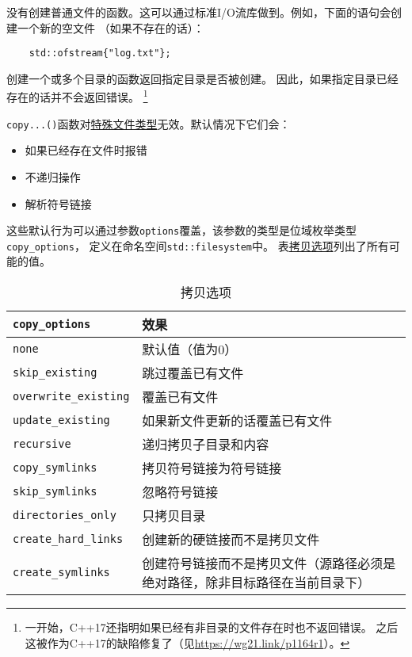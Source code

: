 没有创建普通文件的函数。这可以通过标准I/O流库做到。例如，下面的语句会创建一个新的空文件
（如果不存在的话）：
\begin{lstlisting}
    std::ofstream{"log.txt"};
\end{lstlisting}
创建一个或多个目录的函数返回指定目录是否被创建。
因此，如果指定目录已经存在的话并不会返回错误。
\footnote{一开始，C++17还指明如果已经有非目录的文件存在时也不返回错误。
之后这被作为C++17的缺陷修复了（见\url{https://wg21.link/p1164r1}）。}

\texttt{copy...()}函数对\hyperref[文件类型]{特殊文件类型}无效。默认情况下它们会：
\begin{itemize}
    \item 如果已经存在文件时报错
    \item 不递归操作
    \item 解析符号链接
\end{itemize}
这些默认行为可以通过参数\texttt{options}覆盖，该参数的类型是位域枚举类型\texttt{copy\_options}，
定义在命名空间\texttt{std::filesystem}中。
表\hyperref[t20.16]{拷贝选项}列出了所有可能的值。
\begin{table}[htb]
    \centering
    \begin{tabular}{l|p{}}
        \hline
        \texttt{copy\_options}       & \textbf{效果}                            \\
        \hline
        \texttt{none}                & 默认值（值为0）                               \\
        \texttt{skip\_existing}      & 跳过覆盖已有文件                               \\
        \texttt{overwrite\_existing} & 覆盖已有文件                                 \\
        \texttt{update\_existing}    & 如果新文件更新的话覆盖已有文件                        \\
        \texttt{recursive}           & 递归拷贝子目录和内容                             \\
        \texttt{copy\_symlinks}      & 拷贝符号链接为符号链接                            \\
        \texttt{skip\_symlinks}      & 忽略符号链接                                 \\
        \texttt{directories\_only}   & 只拷贝目录                                  \\
        \texttt{create\_hard\_links} & 创建新的硬链接而不是拷贝文件                         \\
        \texttt{create\_symlinks}    & 创建符号链接而不是拷贝文件（源路径必须是绝对路径，除非目标路径在当前目录下） \\
        \hline
    \end{tabular}
    \caption{拷贝选项}
    \label{t20.16}
\end{table}

